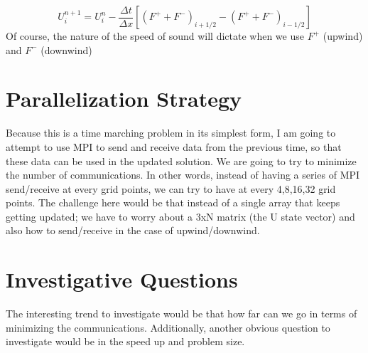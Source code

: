 \documentclass{article}
\begin{document}
	\begin{equation}
		U^{n+1}_{i} = U_i^n-\dfrac{\Delta t}{\Delta x}\left[(F^+ + F^-)_{i+1/2}-(F^+ + F^-)_{i-1/2}\right]
	\end{equation}
	Of course, the nature of the speed of sound will dictate when we use $F^+$ (upwind) and $F^-$ (downwind)
	
	\section{Parallelization Strategy}
	
	Because this is a time marching problem in its simplest form, I am going to attempt to use MPI to send and receive data from the previous time, so that these data can be used in the updated solution.  We are going to try to minimize the number of communications.  In other words, instead of having a series of MPI send/receive at every grid points, we can try to have at every 4,8,16,32 grid points.  The challenge here would be that instead of a single array that keeps getting updated; we have to worry about a 3xN matrix (the U state vector) and also how to send/receive in the case of upwind/downwind. 
	
	\section{Investigative Questions}
	
	The interesting trend to investigate would be that how far can we go in terms of minimizing the communications.  Additionally, another obvious question to investigate would be in the speed up and problem size.  

	
	
	
\end{document}

